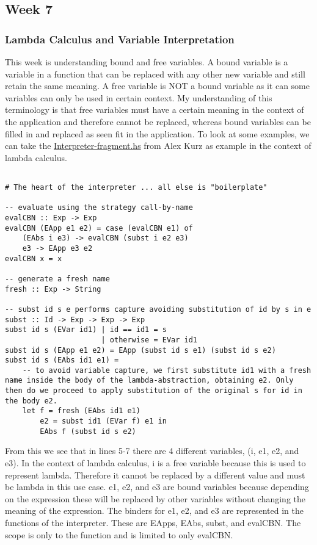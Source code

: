 \documentclass{article}
\theoremstyle{theorem}
\theoremstyle{definition}
\theoremstyle{remark}
\begin{document}
\subsection{Week 7}
\subsubsection{Lambda Calculus and Variable Interpretation}
This week is understanding bound and free variables. A bound variable is a variable in a function that can be replaced with any other new variable and still retain the same meaning. A free variable is NOT a bound variable as it can some variables can only be used in certain context. My understanding of this terminology is that free variables must have a certain meaning in the context of the application and therefore cannot be replaced, whereas bound variables can be filled in and replaced as seen fit in the application. To look at some examples, we can take the \href{https://github.com/alexhkurz/programming-languages-2022/blob/main/src/LambdaNat0/src/Interpreter-fragment.hs}{Interpreter-fragment.hs} from Alex Kurz as example in the context of lambda calculus.
\begin{lstlisting}

# The heart of the interpreter ... all else is "boilerplate"

-- evaluate using the strategy call-by-name
evalCBN :: Exp -> Exp  
evalCBN (EApp e1 e2) = case (evalCBN e1) of
    (EAbs i e3) -> evalCBN (subst i e2 e3)
    e3 -> EApp e3 e2
evalCBN x = x 

-- generate a fresh name
fresh :: Exp -> String

-- subst id s e performs capture avoiding substitution of id by s in e
subst :: Id -> Exp -> Exp -> Exp
subst id s (EVar id1) | id == id1 = s
                      | otherwise = EVar id1
subst id s (EApp e1 e2) = EApp (subst id s e1) (subst id s e2)
subst id s (EAbs id1 e1) = 
    -- to avoid variable capture, we first substitute id1 with a fresh name inside the body of the lambda-abstraction, obtaining e2. Only then do we proceed to apply substitution of the original s for id in the body e2.
    let f = fresh (EAbs id1 e1)
        e2 = subst id1 (EVar f) e1 in 
        EAbs f (subst id s e2)
\end{lstlisting}

From this we see that in lines 5-7 there are 4 different variables, (i, e1, e2, and e3). In the context of lambda calculus, i is a free variable because this is used to represent lambda. Therefore it cannot be replaced by a different value and must be lambda in this use case. e1, e2, and e3 are bound variables because depending on the expression these will be replaced by other variables without changing the meaning of the expression. The binders for e1, e2, and e3 are represented in the functions of the interpreter. These are EApps, EAbs, subst, and evalCBN. The scope is only to the function and is limited to only evalCBN.
\end{document}

